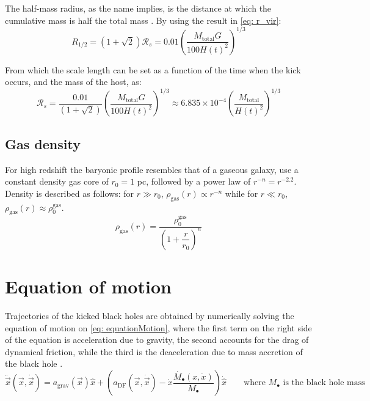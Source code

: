 			The half-mass radius, as the name implies, is the distance at which the cumulative mass is half the total mass \cite{hernquist1990analytical}. By using the result in \autoref{eq: r_vir}:
			\begin{equation}
				R_{1/2} = \left(1 + \sqrt{2}\right)\mathcal{R}_s = 0.01\left({\dfrac{M_\text{total}G}{100 H(t)^2}}\right)^{1/3}
			\end{equation}
			
			From which the scale length can be set as a function of the time when the kick occurs, and the mass of the host, as:
			\begin{equation}
				\mathcal{R}_s = \dfrac{0.01}{\left(1 + \sqrt{2}\right)}\left({\dfrac{M_\text{total}G}{100 H(t)^2}}\right)^{1/3} \approx 6.835\times 10^{-4}\left({\dfrac{M_\text{total}}{H(t)^2}}\right)^{1/3}
			\end{equation}
		\subsection{Gas density}
			For high redshift the baryonic profile resembles that of a gaseous galaxy, \citeauthor{choksi2017recoiling} use a constant density gas core of $r_0 = 1$ pc, followed by a power law of $r^{-n} = r^{-2.2}$. Density is described as follows: for $r \gg r_0$, $\rho_\text{gas}(r)\propto r^{-n}$ while for $r \ll r_0$, $\rho_\text{gas}(r) \approx \rho_0^\text{gas}$.
			\begin{equation}\label{eq: rdensity}
				\rho_\text{gas}(r) = \dfrac{\rho_0^\text{gas}}{\left(1 + \dfrac{r}{r_0}\right)^n}
			\end{equation}
	
	\section{Equation of motion}
		Trajectories of the kicked black holes are obtained by numerically solving the equation of motion on \autoref{eq: equationMotion}, where the first term on the right side of the equation is acceleration due to gravity, the second accounts for the drag of dynamical friction, while the third is the deaceleration due to mass accretion of the black hole \cite{tanaka2009assembly, choksi2017recoiling}.
		\begin{equation}\label{eq: equationMotion}
			\ddot{\vec{x}}(\vec{x}, \dot{\vec{x}}) = a_\text{grav}(\vec{x})\hat{x} + \left(a_\text{DF}(\vec{x}, \dot{\vec{x}})-\dot{x}\dfrac{\dot{M_\bullet}(x, \dot{x})}{M_\bullet}\right)\dot{\hat{x}} \qquad \text{where $M_\bullet$ is the black hole mass}
		\end{equation}
		

